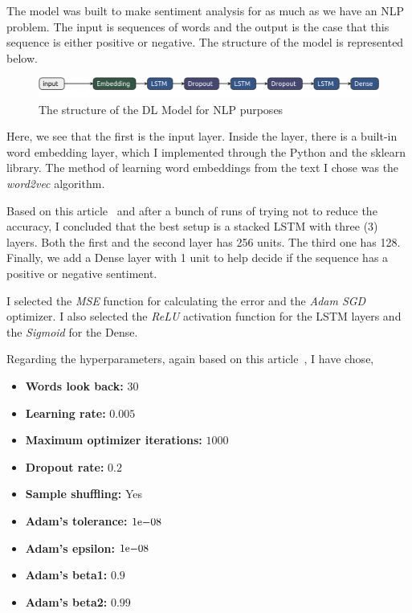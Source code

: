 The model was built to make sentiment analysis for as much as we have an NLP problem.
The input is sequences of words and the output is the case that this sequence is either positive or negative.
The structure of the model is represented below.

\begin{figure}[H]
    \centering
    \includegraphics[scale=.3]{./images/impl/nlp-model.png}
    \caption{The structure of the DL Model for NLP purposes}
    \label{fig:dl_nlp_model}
\end{figure}

Here, we see that the first is the input layer.
Inside the layer, there is a built-in word embedding layer, which I implemented through the Python and the sklearn library.
The method of learning word embeddings from the text I chose was the \emph{word2vec} algorithm.

Based on this article~\cite{rushabhwadkar_2019} and after a bunch of runs of trying not to reduce the accuracy, I concluded that the best setup is a stacked LSTM with three (3) layers.
Both the first and the second layer has 256 units.
The third one has 128.
Finally, we add a Dense layer with 1 unit to help decide if the sequence has a positive or negative sentiment.

I selected the \emph{MSE} function for calculating the error and the \emph{Adam SGD} optimizer.
I also selected the \emph{ReLU} activation function for the LSTM layers and the \emph{Sigmoid} for the Dense.

\newpage

Regarding the hyperparameters, again based on this article~\cite{rushabhwadkar_2019}, I have chose,
\begin{itemize}
    \item \textbf{Words look back:} $30$
    \item \textbf{Learning rate:} $0.005$
    \item \textbf{Maximum optimizer iterations:} $1000$
    \item \textbf{Dropout rate:} $0.2$
    \item \textbf{Sample shuffling:} Yes
    \item \textbf{Adam's tolerance:} ${1}\mathrm{e}{-08}$
    \item \textbf{Adam's epsilon:} ${1}\mathrm{e}{-08}$
    \item \textbf{Adam's beta1:} $0.9$
    \item \textbf{Adam's beta2:} $0.99$
\end{itemize}


